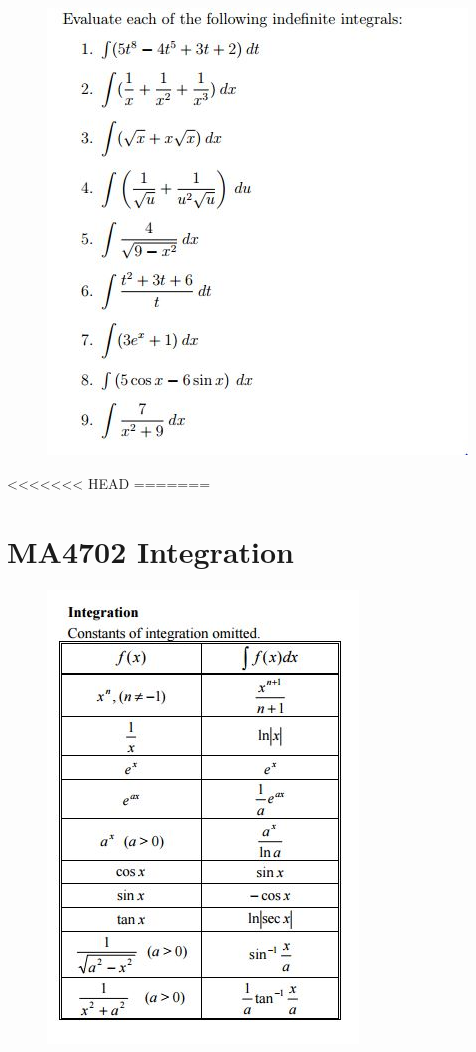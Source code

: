 \documentclass[]{article}
\begin{document}
\begin{figure}[h!]
	\centering
	\includegraphics[width=0.9\linewidth]{Question19integration1}
\end{figure}






<<<<<<< HEAD
=======
\newpage
\section*{MA4702 Integration}


\begin{figure}[h!]
	\centering
	\includegraphics[width=0.55\linewidth]{integrationtabless}
\end{figure}
\end{document}
